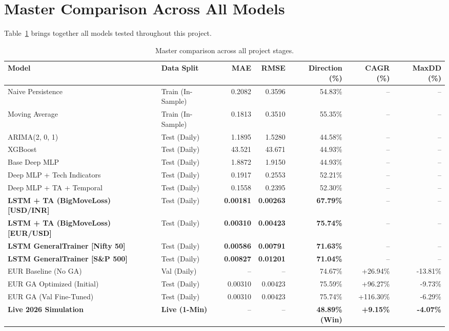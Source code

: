 \section{Master Comparison Across All Models}

Table~\ref{tab:master-comparison} brings together all models tested throughout this project.

\begin{table}[htbp]
\centering
\caption{Master comparison across all project stages.}
\label{tab:master-comparison}
\small
\setlength{\tabcolsep}{4pt}
\begin{tabular}{llrrrrr}
\toprule
\textbf{Model} & \textbf{Data Split} & \textbf{MAE} & \textbf{RMSE} & \textbf{Direction (\%)} & \textbf{CAGR (\%)} & \textbf{MaxDD (\%)} \\
\midrule
Naive Persistence & Train (In-Sample) & 0.2082 & 0.3596 & 54.83\% & -- & -- \\
Moving Average & Train (In-Sample) & 0.1813 & 0.3510 & 55.35\% & -- & -- \\
ARIMA(2, 0, 1) & Test (Daily) & 1.1895 & 1.5280 & 44.58\% & -- & -- \\
XGBoost & Test (Daily) & 43.521 & 43.671 & 44.93\% & -- & -- \\
Base Deep MLP & Test (Daily) & 1.8872 & 1.9150 & 44.93\% & -- & -- \\
Deep MLP + Tech Indicators & Test (Daily) & 0.1917 & 0.2553 & 52.21\% & -- & -- \\
Deep MLP + TA + Temporal & Test (Daily) & 0.1558 & 0.2395 & 52.30\% & -- & -- \\
\midrule
\textbf{LSTM + TA (BigMoveLoss) [USD/INR]} & Test (Daily) & \textbf{0.00181} & \textbf{0.00263} & \textbf{67.79\%} & -- & -- \\
\textbf{LSTM + TA (BigMoveLoss) [EUR/USD]} & Test (Daily) & \textbf{0.00310} & \textbf{0.00423} & \textbf{75.74\%} & -- & -- \\
\textbf{LSTM GeneralTrainer [Nifty 50]} & Test (Daily) & \textbf{0.00586} & \textbf{0.00791} & \textbf{71.63\%} & -- & -- \\
\textbf{LSTM GeneralTrainer [S\&P 500]} & Test (Daily) & \textbf{0.00827} & \textbf{0.01201} & \textbf{71.04\%} & -- & -- \\
\midrule
EUR Baseline (No GA) & Val (Daily) & -- & -- & 74.67\% & +26.94\% & -13.81\% \\
EUR GA Optimized (Initial) & Test (Daily) & 0.00310 & 0.00423 & 75.59\% & +96.27\% & -9.73\% \\
EUR GA (Val Fine-Tuned) & Test (Daily) & 0.00310 & 0.00423 & 75.74\% & +116.30\% & -6.29\% \\
\textbf{Live 2026 Simulation} & \textbf{Live (1-Min)} & -- & -- & \textbf{48.89\% (Win)} & \textbf{+9.15\%} & \textbf{-4.07\%} \\
\bottomrule
\end{tabular}
\end{table}

